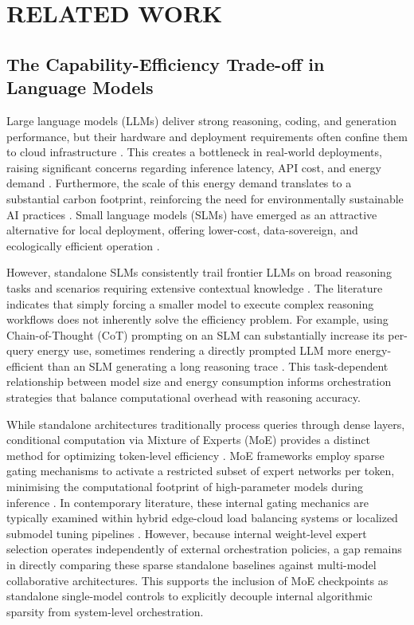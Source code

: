 \chapter{RELATED WORK}

\section{The Capability-Efficiency Trade-off in Language Models}
Large language models (LLMs) deliver strong reasoning, coding, and generation performance, but their hardware and deployment requirements often confine them to cloud infrastructure \cite{egi2025, shao2025dot}. This creates a bottleneck in real-world deployments, raising significant concerns regarding inference latency, API cost, and energy demand \cite{energytoken2025, hao2024hybrid}. Furthermore, the scale of this energy demand translates to a substantial carbon footprint, reinforcing the need for environmentally sustainable AI practices \cite{energytoken2025, arasum2025}. Small language models (SLMs) have emerged as an attractive alternative for local deployment, offering lower-cost, data-sovereign, and ecologically efficient operation \cite{slmreview2025prisma, wang2024slmsurvey}.

However, standalone SLMs consistently trail frontier LLMs on broad reasoning tasks and scenarios requiring extensive contextual knowledge \cite{wang2025collabperf}. The literature indicates that simply forcing a smaller model to execute complex reasoning workflows does not inherently solve the efficiency problem. For example, using Chain-of-Thought (CoT) prompting on an SLM can substantially increase its per-query energy use, sometimes rendering a directly prompted LLM more energy-efficient than an SLM generating a long reasoning trace \cite{energytoken2025}. This task-dependent relationship between model size and energy consumption informs orchestration strategies that balance computational overhead with reasoning accuracy.

While standalone architectures traditionally process queries through dense layers, conditional computation via Mixture of Experts (MoE) provides a distinct method for optimizing token-level efficiency \cite{wang2025collabperf}. MoE frameworks employ sparse gating mechanisms to activate a restricted subset of expert networks per token, minimising the computational footprint of high-parameter models during inference \cite{wang2025collabperf}. In contemporary literature, these internal gating mechanics are typically examined within hybrid edge-cloud load balancing systems or localized submodel tuning pipelines \cite{wang2025collabperf}. However, because internal weight-level expert selection operates independently of external orchestration policies, a gap remains in directly comparing these sparse standalone baselines against multi-model collaborative architectures. This supports the inclusion of MoE checkpoints as standalone single-model controls to explicitly decouple internal algorithmic sparsity from system-level orchestration.

